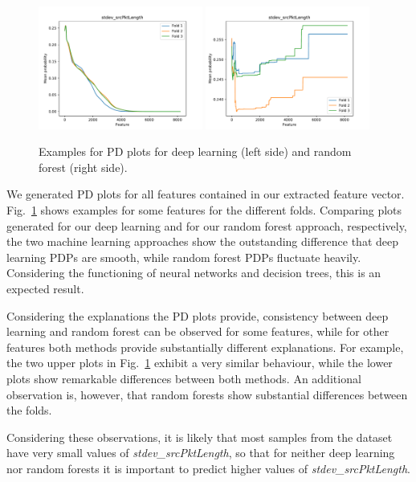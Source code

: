 \documentclass[sigconf,nonacm]{acmart}
\begin{document}
\begin{figure}[p]
\includegraphics[width=0.48\textwidth]{plots/pdp/apply(stdev(ipTotalLength),forward)_nn.pdf}
\includegraphics[width=0.48\textwidth]{plots/pdp/apply(stdev(ipTotalLength),forward)_rf.pdf}

\caption{Examples for PD plots for deep learning (left side) and random forest (right side).}
\label{fig:pdp}
\end{figure}

We generated PD plots for all features contained in our extracted feature vector. Fig.~\ref{fig:pdp} shows examples for some features for the different folds. Comparing plots generated for our deep learning and for our random forest approach, respectively, the two machine learning approaches show the outstanding difference that deep learning PDPs are smooth, while random forest PDPs fluctuate heavily. Considering the functioning of neural networks and decision trees, this is an expected result.

Considering the explanations the PD plots provide, consistency between deep learning and random forest can be observed for some features, while for other features both methods provide substantially different explanations. For example, the two upper plots in Fig.~\ref{fig:pdp} exhibit a very similar behaviour, while the lower plots show remarkable differences between both methods. An additional observation is, however, that random forests show substantial differences between the folds. 

Considering these observations, it is likely that most samples from the dataset have very small values of \textit{stdev\_srcPktLength}, so that for neither deep learning nor random forests it is important to predict higher values of \textit{stdev\_srcPktLength}. 
\end{document}
